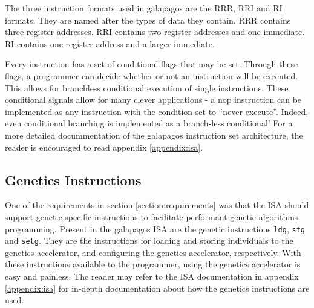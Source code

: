 The three instruction formats used in \Gls{galapagos} are the RRR, RRI and RI formats.
They are named after the types of data they contain.
RRR contains three register addresses.
RRI contains two register addresses and one immediate.
RI contains one register address and a larger immediate.

Every instruction has a set of conditional flags that may be set.
Through these flags, a programmer can decide whether or not an instruction will be executed.
This allows for branchless conditional execution of single instructions.
These conditional signals allow for many clever applications - a \gls{nop} instruction can be implemented as any instruction with the condition set to ``never execute''.
Indeed, even conditional branching is implemented as a branch-less conditional!
For a more detailed docummentation of the \gls{galapagos} instruction set architecture, the reader is encouraged to read appendix \vref{appendix:isa}.


\subsection{Genetics Instructions}

One of the requirements in section \vref{section:requirements} was that the ISA should support genetic-specific instructions to facilitate performant genetic algorithms programming.
Present in the \Gls{galapagos} ISA are the genetic instructions \texttt{ldg}, \texttt{stg} and \texttt{setg}.
They are the instructions for loading and storing \glspl{individual} to the genetics accelerator, and configuring the genetics accelerator, respectively.
With these instructions available to the programmer, using the genetics accelerator is easy and painless.
The reader may refer to the ISA documentation in appendix \vref{appendix:isa} for in-depth documentation about how the genetics instructions are used.

